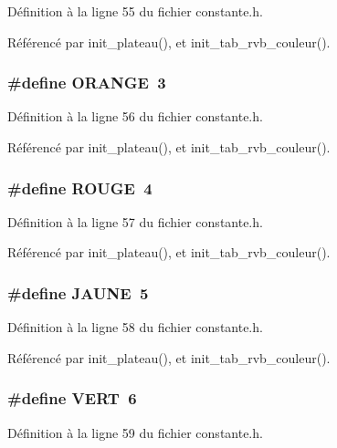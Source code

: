 D\'{e}finition \`{a} la ligne 55 du fichier constante.h.

R\'{e}f\'{e}renc\'{e} par init\_\-plateau(), et init\_\-tab\_\-rvb\_\-couleur().
\subsubsection{\setlength{\rightskip}{0pt plus 5cm}\#define ORANGE~3}\label{constante_8h_c5b6e19bf06822021f35602c59658de3}




D\'{e}finition \`{a} la ligne 56 du fichier constante.h.

R\'{e}f\'{e}renc\'{e} par init\_\-plateau(), et init\_\-tab\_\-rvb\_\-couleur().
\subsubsection{\setlength{\rightskip}{0pt plus 5cm}\#define ROUGE~4}\label{constante_8h_358a59dd21062085dd34d5c228c5f136}




D\'{e}finition \`{a} la ligne 57 du fichier constante.h.

R\'{e}f\'{e}renc\'{e} par init\_\-plateau(), et init\_\-tab\_\-rvb\_\-couleur().
\subsubsection{\setlength{\rightskip}{0pt plus 5cm}\#define JAUNE~5}\label{constante_8h_34c109ff6a0293c4706defe141ef7e0c}




D\'{e}finition \`{a} la ligne 58 du fichier constante.h.

R\'{e}f\'{e}renc\'{e} par init\_\-plateau(), et init\_\-tab\_\-rvb\_\-couleur().
\subsubsection{\setlength{\rightskip}{0pt plus 5cm}\#define VERT~6}\label{constante_8h_22c2b7cb14b1ffb516a9ed4a164b5cda}




D\'{e}finition \`{a} la ligne 59 du fichier constante.h.

